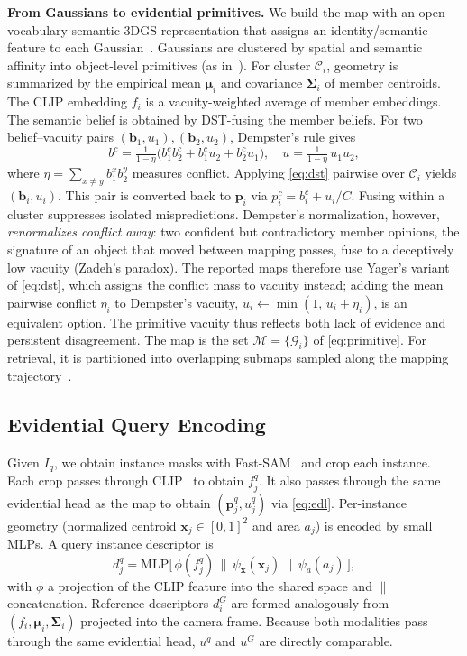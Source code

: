 \documentclass[journal]{IEEEtran}
\begin{document}
\textbf{From Gaussians to evidential primitives.} We build the map with an open-vocabulary semantic 3DGS representation that assigns an identity/semantic feature to each Gaussian~\cite{gaussiangroup}. Gaussians are clustered by spatial and semantic affinity into object-level primitives (as in~\cite{chukim}). For cluster $\mathcal{C}_i$, geometry is summarized by the empirical mean $\bm{\mu}_i$ and covariance $\bm{\Sigma}_i$ of member centroids. The CLIP embedding $f_i$ is a vacuity-weighted average of member embeddings. The semantic belief is obtained by DST-fusing the member beliefs. For two belief--vacuity pairs $(\mathbf{b}_1,u_1),(\mathbf{b}_2,u_2)$, Dempster's rule gives~\cite{e2bki}
\begin{equation}
b^c=\tfrac{1}{1-\eta}\big(b_1^c b_2^c + b_1^c u_2 + b_2^c u_1\big),\quad
u=\tfrac{1}{1-\eta}\,u_1 u_2,
\label{eq:dst}
\end{equation}
where $\eta=\sum_{x\neq y} b_1^x b_2^y$ measures conflict. Applying \eqref{eq:dst} pairwise over $\mathcal{C}_i$ yields $(\mathbf{b}_i,u_i)$. This pair is converted back to $\mathbf{p}_i$ via $p_i^c=b_i^c+u_i/C$. Fusing within a cluster suppresses isolated mispredictions. Dempster's normalization, however, \emph{renormalizes conflict away}: two confident but contradictory member opinions, the signature of an object that moved between mapping passes, fuse to a deceptively low vacuity (Zadeh's paradox). The reported maps therefore use Yager's variant~\cite{yager} of \eqref{eq:dst}, which assigns the conflict mass to vacuity instead; adding the mean pairwise conflict $\bar\eta_i$ to Dempster's vacuity, $u_i\leftarrow\min(1,\,u_i+\bar\eta_i)$, is an equivalent option. The primitive vacuity thus reflects both lack of evidence and persistent disagreement. The map is the set $\mathcal{M}=\{\mathcal{G}_i\}$ of \eqref{eq:primitive}. For retrieval, it is partitioned into overlapping submaps sampled along the mapping trajectory~\cite{sgloc}.

\subsection{Evidential Query Encoding}
Given $I_q$, we obtain instance masks with Fast-SAM~\cite{fastsam} and crop each instance. Each crop passes through CLIP~\cite{clip} to obtain $f_j^q$. It also passes through the same evidential head as the map to obtain $(\mathbf{p}_j^q,u_j^q)$ via \eqref{eq:edl}. Per-instance geometry (normalized centroid $\mathbf{x}_j\in[0,1]^2$ and area $a_j$) is encoded by small MLPs. A query instance descriptor is
\begin{equation}
d_j^q=\mathrm{MLP}\big[\,\phi(f_j^q)\,\|\,\psi_{\mathbf{x}}(\mathbf{x}_j)\,\|\,\psi_a(a_j)\,\big],
\label{eq:querydesc}
\end{equation}
with $\phi$ a projection of the CLIP feature into the shared space and $\|$ concatenation. Reference descriptors $d_i^G$ are formed analogously from $(f_i,\bm{\mu}_i,\bm{\Sigma}_i)$ projected into the camera frame. Because both modalities pass through the same evidential head, $u^q$ and $u^G$ are directly comparable.
\end{document}
